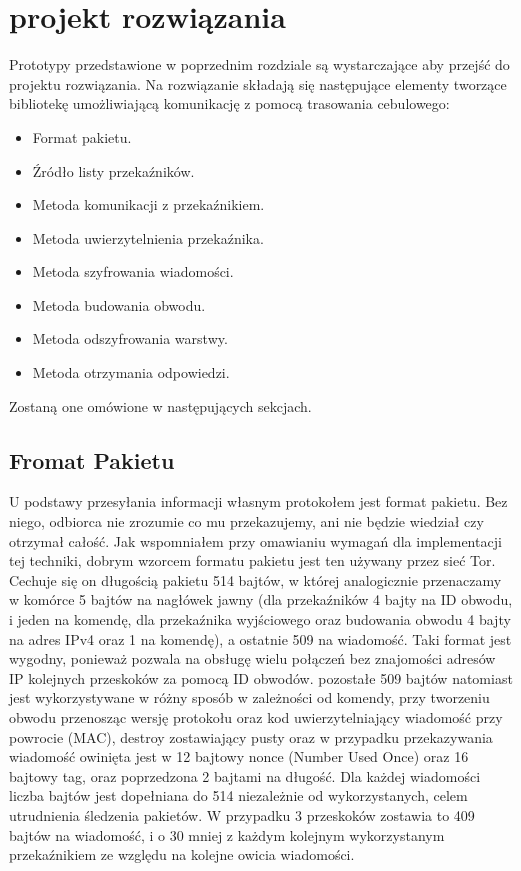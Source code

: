 \documentclass[thesis=inz,faculty=ee]{EE-dyplom}
\begin{document}
    \chapter{projekt rozwiązania}

    Prototypy przedstawione w poprzednim rozdziale są wystarczające aby przejść do projektu rozwiązania. Na rozwiązanie składają się następujące elementy tworzące bibliotekę
    umożliwiającą komunikację z pomocą trasowania cebulowego:

    \begin{itemize}
        \item Format pakietu.
        \item Źródło listy przekaźników.
        \item Metoda komunikacji z przekaźnikiem.
        \item Metoda uwierzytelnienia przekaźnika.
        \item Metoda szyfrowania wiadomości.
        \item Metoda budowania obwodu.
        \item Metoda odszyfrowania warstwy.
        \item Metoda otrzymania odpowiedzi.
    \end{itemize}

    Zostaną one omówione w następujących sekcjach.

    \section{Fromat Pakietu}

    U podstawy przesyłania informacji własnym protokołem jest format pakietu. Bez niego, odbiorca nie zrozumie co mu przekazujemy, ani nie będzie wiedział czy otrzymał całość.
    Jak wspomniałem przy omawianiu wymagań dla implementacji tej techniki, dobrym wzorcem formatu pakietu jest ten używany przez sieć Tor\cite{tor_spec}. Cechuje się on
    długością pakietu 514 bajtów, w której analogicznie przenaczamy w komórce 5 bajtów na nagłówek jawny (dla przekaźników 4 bajty na ID obwodu, i jeden na komendę, dla 
    przekaźnika wyjściowego oraz budowania obwodu 4 bajty na adres IPv4 oraz 1 na komendę), a ostatnie 509 na wiadomość. Taki format jest wygodny, ponieważ pozwala 
    na obsługę wielu połączeń bez znajomości adresów IP kolejnych przeskoków za pomocą ID obwodów. pozostałe 509 bajtów natomiast jest wykorzystywane w różny sposób w
    zależności od komendy, przy tworzeniu obwodu przenosząc wersję protokołu oraz kod uwierzytelniający wiadomość przy powrocie (MAC), destroy zostawiający pusty oraz 
    w przypadku przekazywania wiadomość owinięta jest w 12 bajtowy nonce (Number Used Once) oraz 16 bajtowy tag, oraz poprzedzona 2 bajtami na długość. Dla każdej wiadomości
    liczba bajtów jest dopełniana do 514 niezależnie od wykorzystanych, celem utrudnienia śledzenia pakietów. W przypadku 3 przeskoków zostawia to 409 bajtów na wiadomość,
    i o 30 mniej z każdym kolejnym wykorzystanym przekaźnikiem ze względu na kolejne owicia wiadomości.
\end{document}
